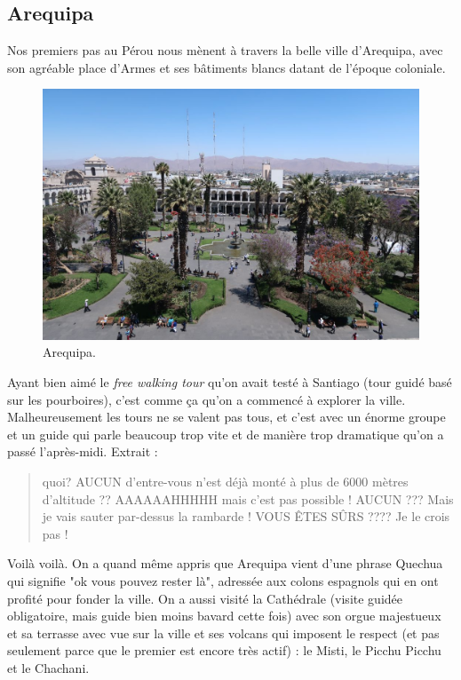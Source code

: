 \hypertarget{arequipa}{%
\subsection{Arequipa}\label{arequipa}}

Nos premiers pas au Pérou nous mènent à travers la belle ville
d'Arequipa, avec son agréable place d'Armes et ses bâtiments blancs
datant de l'époque coloniale.

\begin{figure}
\centering
\includegraphics{images/20180911_arequipa.JPG}
\caption{Arequipa.}
\end{figure}

Ayant bien aimé le \emph{free walking tour} qu'on avait testé à Santiago
(tour guidé basé sur les pourboires), c'est comme ça qu'on a commencé à
explorer la ville. Malheureusement les tours ne se valent pas tous, et
c'est avec un énorme groupe et un guide qui parle beaucoup trop vite et
de manière trop dramatique qu'on a passé l'après-midi. Extrait :

\begin{quote}
quoi? AUCUN d'entre-vous n'est déjà monté à plus de 6000 mètres
d'altitude ?? AAAAAAHHHHH mais c'est pas possible ! AUCUN ??? Mais je
vais sauter par-dessus la rambarde ! VOUS ÊTES SÛRS ???? Je le crois pas
!
\end{quote}

Voilà voilà. On a quand même appris que Arequipa vient d'une phrase
Quechua qui signifie "ok vous pouvez rester là", adressée aux colons
espagnols qui en ont profité pour fonder la ville. On a aussi visité la
Cathédrale (visite guidée obligatoire, mais guide bien moins bavard
cette fois) avec son orgue majestueux et sa terrasse avec vue sur la
ville et ses volcans qui imposent le respect (et pas seulement parce que
le premier est encore très actif) : le Misti, le Picchu Picchu et le
Chachani.

